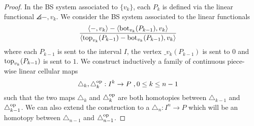 \begin{proof}
	In the BS system associated to $\{v_k\}$, each $P_k$ is defined via the linear functional $\angles{-,v_k}$.
	We consider the BS system associated to the linear functionals
	\begin{equation} \label{eq:new-projection}
		\frac{\langle-,v_k\rangle-\langle\operatorname{bot}_{v_k}(P_{k-1}),v_k\rangle}{\langle\operatorname{top}_{v_k}(P_{k-1})-\operatorname{bot}_{v_k}(P_{k-1}),v_k\rangle}
	\end{equation}
	where each $P_{k-1}$ is sent to the interval $I$, the vertex $\bm_{v_k}(P_{k-1})$ is sent to $0$ and $\operatorname{top}_{v_k}(P_{k-1})$ is sent to $1$.
	We construct inductively a family of continuous piece-wise linear cellular maps
	\[
	\triangle_k, \triangle_k^{\mathrm{op}}: I^k \to P \ , 0 \leq k \leq n-1
	\]
	such that the two maps $\triangle_k$ and $\triangle_k^{\mathrm{op}}$ are both homotopies between $\triangle_{k-1}$ and $\triangle_{k-1}^{\mathrm{op}}$.
	We can also extend the construction to a $\triangle_n : I^n \to P$ which will be an homotopy between $\triangle_{n-1}$ and $\triangle_{n-1}^{\mathrm{op}}$.


\end{proof}
